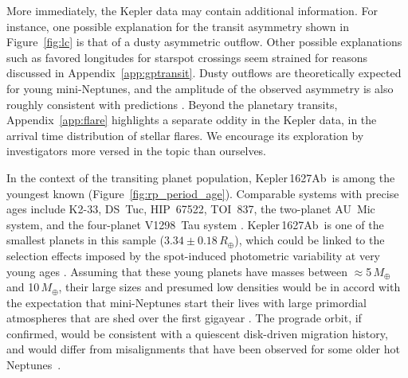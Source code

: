 \documentclass[12pt,modern,twocolumn,tighten]{aastex63}
\newcommand{\pn}{Kepler\,1627Ab} %
\begin{document}
More immediately, the Kepler data may contain additional
information.  For instance, one possible explanation for the transit
asymmetry shown in Figure~\ref{fig:lc} is that of a dusty asymmetric
outflow.  Other possible explanations such as favored longitudes for
starspot crossings seem strained for reasons discussed in
Appendix~\ref{app:gptransit}.  Dusty outflows are theoretically
expected for young mini-Neptunes, and the amplitude of the observed
asymmetry is also roughly consistent with predictions
\citep{wang_dai_2019}.  Beyond the planetary transits,
Appendix~\ref{app:flare} highlights a separate oddity in the Kepler
data, in the arrival time distribution of stellar flares.  We
encourage its exploration by investigators more versed in the topic
than ourselves.

In the context of the transiting planet population, \pn\ is among the
youngest known (Figure~\ref{fig:rp_period_age}).  Comparable systems
with precise ages include K2-33, DS~Tuc, HIP~67522,
TOI~837, the two-planet AU~Mic system, and the four-planet V1298~Tau
system
\citep{Mann_K2_33b_2016,David_et_al_2017,newton_tess_2019,david_four_2019,bouma_cluster_2020,plavchan_planet_2020,martioli_aumicbc_2021}.
\pn\ is one of the smallest planets in this sample ($3.34\pm
0.18\,R_\oplus$), which could be linked to the selection effects
imposed by the spot-induced photometric variability at very young ages
\citep[{\it e.g.},][]{zhou_2021_tois}.  Assuming that these young
planets have masses between $\approx$5$\,M_\oplus$ and 10$\,M_\oplus$,
their large sizes and presumed low densities would be in accord with
the expectation that mini-Neptunes start their lives with large
primordial atmospheres that are shed over the first gigayear
\citep{Owen_Wu_2013,Fulton_et_al_2017,ginzburg_corepowered_2018}.  The
prograde orbit, if confirmed, would be consistent with a quiescent
disk-driven migration history, and would differ from misalignments that
have been observed for some older
hot Neptunes~\citep{sanchis-ojeda_starspots_2011,albrecht_obliquities_2012,dalal_2019_hd3167,rubenzahl_tess-keck_2021}.

\end{document}
